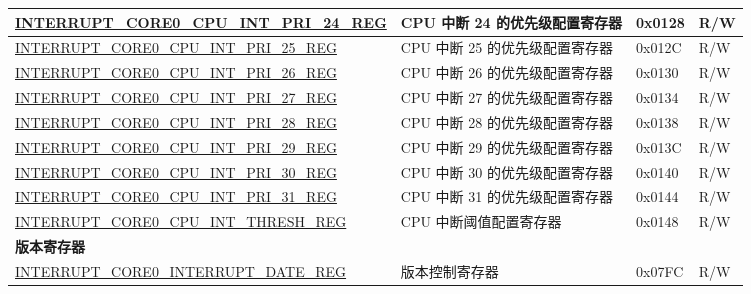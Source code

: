 \begin{longtable}{ | p{10cm} | m{10cm} | m{1.3cm} | m{1.0cm} | }
\hyperref[regdesc:INTERRUPTCORE0CPUINTPRI0REG]{INTERRUPT\_CORE0\_CPU\_INT\_PRI\_24\_REG} & CPU 中断 24 的优先级配置寄存器 & 0x0128 & R/W \\ \hline
\hyperref[regdesc:INTERRUPTCORE0CPUINTPRI0REG]{INTERRUPT\_CORE0\_CPU\_INT\_PRI\_25\_REG} & CPU 中断 25 的优先级配置寄存器 & 0x012C & R/W \\ \hline
\hyperref[regdesc:INTERRUPTCORE0CPUINTPRI0REG]{INTERRUPT\_CORE0\_CPU\_INT\_PRI\_26\_REG} & CPU 中断 26 的优先级配置寄存器 & 0x0130 & R/W \\ \hline
\hyperref[regdesc:INTERRUPTCORE0CPUINTPRI0REG]{INTERRUPT\_CORE0\_CPU\_INT\_PRI\_27\_REG} & CPU 中断 27 的优先级配置寄存器 & 0x0134 & R/W \\ \hline
\hyperref[regdesc:INTERRUPTCORE0CPUINTPRI0REG]{INTERRUPT\_CORE0\_CPU\_INT\_PRI\_28\_REG} & CPU 中断 28 的优先级配置寄存器 & 0x0138 & R/W \\ \hline
\hyperref[regdesc:INTERRUPTCORE0CPUINTPRI0REG]{INTERRUPT\_CORE0\_CPU\_INT\_PRI\_29\_REG} & CPU 中断 29 的优先级配置寄存器 & 0x013C & R/W \\ \hline
\hyperref[regdesc:INTERRUPTCORE0CPUINTPRI0REG]{INTERRUPT\_CORE0\_CPU\_INT\_PRI\_30\_REG} & CPU 中断 30 的优先级配置寄存器 & 0x0140 & R/W \\ \hline
\hyperref[regdesc:INTERRUPTCORE0CPUINTPRI0REG]{INTERRUPT\_CORE0\_CPU\_INT\_PRI\_31\_REG} & CPU 中断 31 的优先级配置寄存器 & 0x0144 & R/W \\ \hline
\hyperref[regdesc:INTERRUPTCORE0CPUINTTHRESHREG]{INTERRUPT\_CORE0\_CPU\_INT\_THRESH\_REG} & CPU 中断阈值配置寄存器 & 0x0148 & R/W \\ \hline
\multicolumn{4}{|l|}{\textbf{版本寄存器}} \\ \hline
\hyperref[regdesc:INTERRUPTCORE0INTERRUPTDATEREG]{INTERRUPT\_CORE0\_INTERRUPT\_DATE\_REG} & 版本控制寄存器 & 0x07FC & R/W \\ \hline
\end{longtable}
